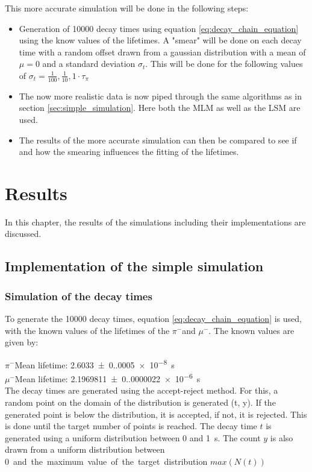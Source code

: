 \documentclass[11pt, a4paper, oneside]{book}
\newcommand{\pion}{$\pi^{-}$}
\newcommand{\muon}{$\mu^{-}$}
\begin{document}
This more accurate simulation will be done in the following steps:
\begin{itemize}
  \item Generation of \num{10000} decay times using equation \ref{eq:decay_chain_equation} using the know values of the lifetimes. A "smear" will be done on each decay time with a random offset drawn from a gaussian distribution with a mean of $\mu = 0$ and a standard deviation $\sigma_t$. This will be done for the following values of $\sigma_t = \frac{1}{100}, \frac{1}{10}, 1 \cdot \tau_\pi$
  \item The now more realistic data is now piped through the same algorithms as in section \ref{sec:simple_simulation}. Here both the MLM as well as the LSM are used.
  \item The results of the more accurate simulation can then be compared to see if and how the smearing influences the fitting of the lifetimes.
\end{itemize}


\chapter{Results}

In this chapter, the results of the simulations including their implementations are discussed.

\section{Implementation of the simple simulation}

\subsection{Simulation of the decay times}
To generate the \num{10000} decay times, equation \ref{eq:decay_chain_equation} is used, with the known values of the lifetimes of the \pion and \muon. The known values are given by: \cite{ParticleDataGroup:2024cfk}

\pion Mean lifetime: \qty{2.6033(0.0005)e-8}{\s} \\
\muon Mean lifetime: \qty{2.1969811(0.0000022)e-6}{\s} \\

The decay times are generated using the accept-reject method. For this, a random point on the domain of the distribution is generated (t, y). If the generated point is below the distribution, it is accepted, if not, it is rejected. This is done until the target number of points is reached. 
The decay time $t$ is generated using a uniform distribution between 0 and \qty{1}{\s}. The count $y$ is also drawn from a uniform distribution between \qty{0} and the maximum value of the target distribution $max(N(t))$
\end{document}
